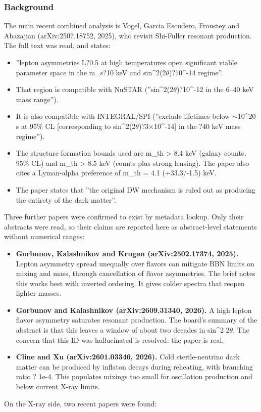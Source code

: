 \documentclass[11pt,a4paper]{article}
\begin{document}
\subsubsection*{Background}
The main recent combined analysis is Vogel, Garcia Escudero, Froustey and Abazajian (arXiv:2507.18752, 2025), who revisit Shi-Fuller resonant production. The full text was read, and states:

\begin{itemize}
  \item ''lepton asymmetries L?0.5 at high temperatures open significant viable parameter space in the m\_s?10 keV and sin\textasciicircum{}2(2$\theta$)?10\textasciicircum{}-14 regime''.
  \item That region is compatible with NuSTAR (''sin\textasciicircum{}2(2$\theta$)?10\textasciicircum{}-12 in the 6--40 keV mass range'').
  \item It is also compatible with INTEGRAL/SPI (''exclude lifetimes below $\sim$10\textasciicircum{}20 s at 95\% CL [corresponding to sin\textasciicircum{}2(2$\theta$)?3$\times$10\textasciicircum{}-14] in the ?40 keV mass regime'').
  \item The structure-formation bounds used are m\_th \textgreater{} 8.4 keV (galaxy counts, 95\% CL) and m\_th \textgreater{} 8.5 keV (counts plus strong lensing). The paper also cites a Lyman-alpha preference of m\_th = 4.1 (+33.3/-1.5) keV.
  \item The paper states that ''the original DW mechanism is ruled out as producing the entirety of the dark matter''.
\end{itemize}
Three further papers were confirmed to exist by metadata lookup. Only their abstracts were read, so their claims are reported here as abstract-level statements without numerical ranges:

\begin{itemize}
  \item \textbf{Gorbunov, Kalashnikov and Krugan (arXiv:2502.17374, 2025).} Lepton asymmetry spread unequally over flavors can mitigate BBN limits on mixing and mass, through cancellation of flavor asymmetries. The brief notes this works best with inverted ordering. It gives colder spectra that reopen lighter masses.
  \item \textbf{Gorbunov and Kalashnikov (arXiv:2609.31340, 2026).} A high lepton flavor asymmetry saturates resonant production. The board's summary of the abstract is that this leaves a window of about two decades in sin\textasciicircum{}2 2$\theta$. The concern that this ID was hallucinated is resolved: the paper is real.
  \item \textbf{Cline and Xu (arXiv:2601.03346, 2026).} Cold sterile-neutrino dark matter can be produced by inflaton decays during reheating, with branching ratio ? 1e-4. This populates mixings too small for oscillation production and below current X-ray limits.
\end{itemize}
On the X-ray side, two recent papers were found:
\end{document}
